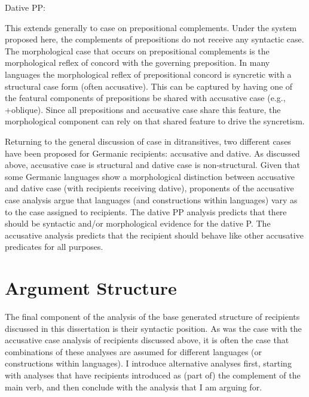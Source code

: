 \begin{exe}
\ex Dative PP: \\
\end{exe}

This extends generally to case on prepositional complements. Under the system proposed here, the complements of prepositions do not receive any syntactic case. The morphological case that occurs on prepositional complements is the morphological reflex of concord with the governing preposition. In many languages the morphological reflex of prepositional concord is syncretic with a structural case form (often accusative). This can be captured by having one of the featural components of prepositions be shared with accusative case (e.g., +oblique). Since all prepositions and accusative case share this feature, the morphological component can rely on that shared feature to drive the syncretism.

Returning to the general discussion of case in ditransitives, two different cases have been proposed for Germanic recipients: accusative and dative. As discussed above, accusative case is structural and dative case is non-structural. Given that some Germanic languages show a morphological distinction between accusative and dative case (with recipients receiving dative), proponents of the accusative case analysis argue that languages (and constructions within languages) vary as to the case assigned to recipients. The dative PP analysis predicts that there should be syntactic and/or morphological evidence for the dative P. The accusative analysis predicts that the recipient should behave like other accusative predicates for all purposes.

\section{Argument Structure}
The final component of the analysis of the base generated structure of recipients discussed in this dissertation is their syntactic position. As was the case with the accusative case analysis of recipients discussed above, it is often the case that combinations of these analyses are assumed for different languages (or constructions within languages). I introduce alternative analyses first, starting with analyses that have recipients introduced as (part of) the complement of the main verb, and then conclude with the analysis that I am arguing for.


